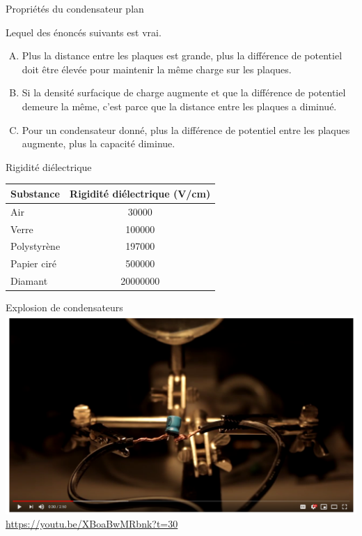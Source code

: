 \documentclass{beamer}
\begin{document}
\begin{frame}[t]{Propriétés du condensateur plan}

Lequel des énoncés suivants est vrai.

\begin{enumerate}[A.]
  \item<alert@2> Plus la distance entre les plaques est grande, plus la différence de
    potentiel doit être élevée pour maintenir la même charge sur les plaques.
  \item Si la densité surfacique de charge augmente et que la différence de
    potentiel demeure la même, c'est parce que la distance entre les plaques a
    diminué.
  \item Pour un condensateur donné, plus la différence de potentiel entre les
    plaques augmente, plus la capacité diminue.
\end{enumerate}

\end{frame}


\begin{frame}{Rigidité diélectrique}

\begin{center}
\begin{tabular}{lS}
  \toprule
  Substance       &        {Rigidité diélectrique (\si{V/cm})}     \\
  \midrule
  Air             &  30000  \\
  Verre           &  100000 \\
  Polystyrène     &  197000 \\
  Papier ciré     &  500000 \\
  Diamant         &  20000000 \\
  \bottomrule
\end{tabular}
\end{center}
\end{frame}



\begin{frame}{Explosion de condensateurs}
  \includegraphics[width=\textwidth]{figures/explosion-condensateur.png}
  \url{https://youtu.be/XBoaBwMRbnk?t=30}
\end{frame}
\end{document}
